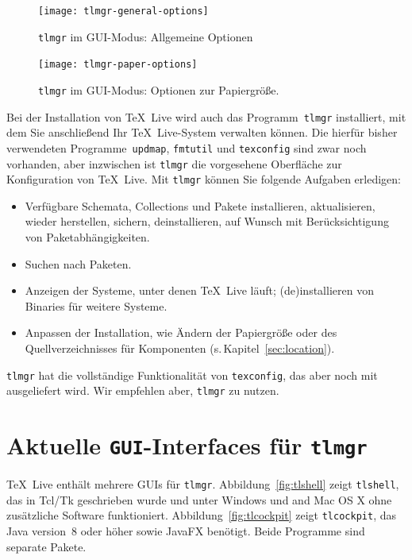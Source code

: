 \documentclass[12pt,ngerman,a4paper,fullparskip]{report}
\newcommand{\TL}{\TeX\ Live\xspace}
\newcommand{\cmdname}[1]{\texttt{#1}}
\newcommand{\prog}[1]{\texttt{#1}}
\begin{document}
\begin{figure}[h]
	\centering
    \texttt{[image: tlmgr-general-options]}
    \caption{\texttt{tlmgr} im GUI-Modus: Allgemeine Optionen}
    \label{fig:tlmgr-general-options}
\end{figure}

\begin{figure}[h]
\centering
\texttt{[image: tlmgr-paper-options]}
    \caption{\texttt{tlmgr} im GUI-Modus: Optionen zur Papiergröße.}
    \label{fig:tlmgr-paper-options}
\end{figure}

Bei der Installation von \TL wird auch das Programm~\prog{tlmgr} installiert, mit dem Sie anschließend Ihr \TL-System verwalten können. Die hierfür bisher verwendeten Programme~\prog{updmap}, \prog{fmtutil} und \prog{texconfig} sind zwar noch vorhanden, aber inzwischen ist \prog{tlmgr} die vorgesehene Oberfläche zur Konfiguration von \TL. Mit \prog{tlmgr} können Sie folgende Aufgaben erledigen:

\begin{itemize} %
\item Verfügbare Schemata, Collections und Pakete installieren, aktualisieren, wieder
     herstellen, sichern, deinstallieren, auf Wunsch mit Berücksichtigung von Paketabhängigkeiten.
\item Suchen nach Paketen.
\item Anzeigen der Systeme, unter denen \TL läuft; (de)installieren von Binaries für weitere Systeme.
\item Anpassen der Installation, wie Ändern der Papiergröße oder des Quellverzeichnisses für Komponenten
 (s.\,Kapitel~\ref{sec:location}).
\end{itemize}

\prog{tlmgr} hat die vollständige Funktionalität von \prog{texconfig}, das aber noch mit ausgeliefert wird. Wir empfehlen aber, \prog{tlmgr} zu nutzen.

\section{Aktuelle \texttt{GUI}-Interfaces für \cmdname{tlmgr}}

\TL{} enthält mehrere GUIs für \prog{tlmgr}. Abbildung~\ref{fig:tlshell} zeigt \cmdname{tlshell},
das in Tcl/Tk geschrieben wurde und unter Windows und 
and Mac OS X ohne zusätzliche Software funktioniert. Abbildung~\ref{fig:tlcockpit} zeigt \prog{tlcockpit}, das Java version~8 oder höher sowie JavaFX benötigt. Beide Programme sind separate Pakete.
\end{document}
